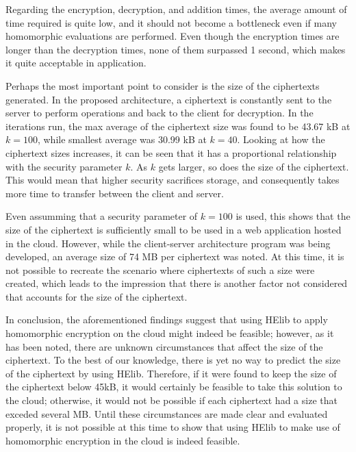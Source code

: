 
Regarding the encryption, decryption, and addition times, the average amount of time required is quite low, and it should not become a bottleneck even if many homomorphic evaluations are performed. Even though the encryption times are longer than the decryption times, none of them surpassed 1 second, which makes it quite acceptable in application. 

Perhaps the most important point to consider is the size of the ciphertexts generated. In the proposed architecture, a ciphertext is constantly sent to the server to perform operations and back to the client for decryption. In the iterations run, the max average of the ciphertext size was found to be 43.67 kB at $k=100$, while smallest average was 30.99 kB at $k=40$. Looking at how the ciphertext sizes increases, it can be seen that it has a proportional relationship with the security parameter $k$. As $k$ gets larger, so does the size of the ciphertext. This would mean that higher security sacrifices storage, and consequently takes more time to transfer between the client and server.

Even assumming that a security parameter of $k=100$ is used, this shows that the size of the ciphertext is sufficiently small to be used in a web application hosted in the cloud. However, while the client-server architecture program was being developed, an average size of 74 MB per ciphertext was noted. At this time, it is not possible to recreate the scenario where ciphertexts of such a size were created, which leads to the impression that there is another factor not considered that accounts for the size of the ciphertext.

In conclusion, the aforementioned findings suggest that using HElib to apply homomorphic encryption on the cloud might indeed be feasible; however, as it has been noted, there are unknown circumstances that affect the size of the ciphertext. To the best of our knowledge, there is yet no way to predict the size of the ciphertext by using HElib. Therefore, if it were found to keep the size of the ciphertext below 45kB, it would certainly be feasible to take this solution to the cloud; otherwise, it would not be possible if each ciphertext had a size that exceded several MB. Until these circumstances are made clear and evaluated properly, it is not possible at this time to show that using HElib to make use of homomorphic encryption in the cloud is indeed feasible. 


\clearpage
